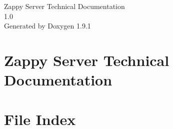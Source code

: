 \let\mypdfximage\pdfximage\def\pdfximage{\immediate\mypdfximage}\documentclass[twoside]{book}
\newcommand{\+}{\discretionary{\mbox{\scriptsize$\hookleftarrow$}}{}{}}
\newcommand{\clearemptydoublepage}{%
  \newpage{\pagestyle{empty}\cleardoublepage}%
}
\begin{document}
\raggedbottom

\hypersetup{pageanchor=false,
             bookmarksnumbered=true,
             pdfencoding=unicode
            }
\begin{titlepage}
\vspace*{7cm}
\begin{center}%
{\Large Zappy Server Technical Documentation \\[1ex]\large 1.\+0 }\\
\vspace*{1cm}
{\large Generated by Doxygen 1.9.1}\\
\end{center}
\end{titlepage}
\clearemptydoublepage
{}
\tableofcontents
\clearemptydoublepage
{}
\hypersetup{pageanchor=true}

\chapter{Zappy Server Technical Documentation}
\label{index}\hypertarget{index}{}
\chapter{File Index}

\end{document}

